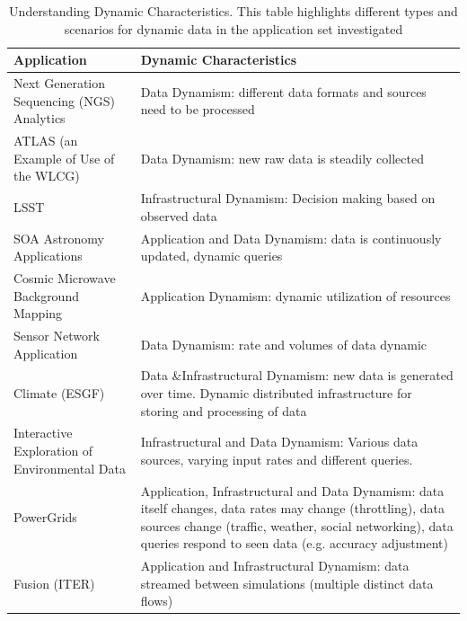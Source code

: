\begin{table}[h]
  \begin{scriptsize}
    \begin{center}
      \caption{Understanding Dynamic Characteristics. This table
        highlights different types and scenarios for dynamic data in
        the application set investigated %
          }
          \label{tab:app_dyn_char}
      \begin{tabular}{|p{4cm}|p{9.5cm}|}
		\hline
		\textbf{Application} &\textbf{Dynamic Characteristics} \\		
		\hline		
		Next Generation Sequencing (NGS) Analytics
		& Data Dynamism: different data formats and sources need to be processed\\
		\hline
                ATLAS (an Example of Use of the WLCG)
		& Data Dynamism: new raw data is steadily collected\\
		\hline
                LSST & Infrastructural Dynamism: Decision making based on observed data\\
		\hline
                SOA Astronomy Applications
		&  Application and Data Dynamism: data is continuously updated, dynamic queries\\
		\hline
                Cosmic Microwave Background Mapping
		& Application Dynamism: dynamic utilization of resources\\
		\hline
                Sensor Network Application
                & Data Dynamism: rate and volumes of data dynamic \\
		\hline
                Climate (ESGF) & Data \&Infrastructural Dynamism: new data is generated over time. Dynamic distributed infrastructure for storing and processing of data
                \\
		\hline
                Interactive Exploration of Environmental Data
		& Infrastructural and Data Dynamism: Various data sources, varying
		input rates and different queries.\\
		\hline
                PowerGrids
		& Application, Infrastructural and Data Dynamism: data itself changes,
		data rates may change (throttling), data sources change (traffic,
		weather, social networking), data queries respond to seen data (e.g.
		accuracy adjustment) \\
		\hline
                Fusion (ITER)
                & Application and Infrastructural Dynamism: data streamed
				between simulations (multiple distinct data flows)  \\

\end{tabular}
\end{center}
\end{scriptsize}
\end{table}
